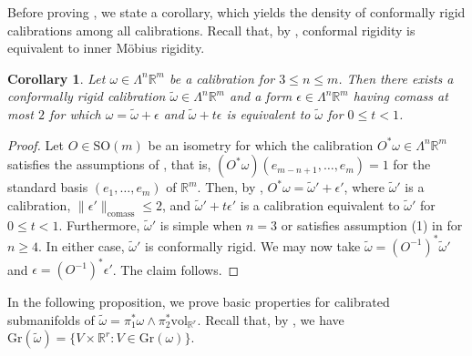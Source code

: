 \documentclass[a4paper,leqno,11pt]{amsart}
\numberwithin{equation}{section}
\newtheorem{corollary}[theorem]{Corollary}
\theoremstyle{remark}
\theoremstyle{remark}
\newcommand{\R}{\mathbb{R}}
\newcommand{\vol}{\mathrm{vol}}
\newcommand{\comass}{\mathrm{comass}}
\newcommand{\Gr}{\mathrm{Gr}}
\newcommand{\SO}{\mathrm{SO}}
\begin{document}
Before proving , we state a corollary, which yields the density of conformally rigid calibrations among all calibrations. Recall that, by , conformal rigidity is equivalent to inner Möbius rigidity. 

\begin{corollary}\label{cor:applicability}
Let $\omega \in \Lambda^n \R^m$ be a calibration for $3 \leq n \leq m$. Then there exists a conformally rigid calibration $\widetilde \omega\in \Lambda^n \R^m$ and a form $\epsilon\in \Lambda^n \R^m$ having comass at most $2$ for which $\omega = \widetilde \omega + \epsilon$ and $\widetilde \omega + t\epsilon$ is equivalent to $\widetilde \omega$ for $0\le t < 1$.
\end{corollary}

\begin{proof}
Let $O \in \SO(m)$ be an isometry for which the calibration $O^*\omega \in \Lambda^n \R^m$ satisfies the assumptions of , that is, $(O^*\omega)(e_{m-n+1},\ldots, e_m) =1$ for the standard basis $(e_1,\ldots, e_m)$ of $\R^m$. Then, by , $O^{*}\omega = \widetilde{\omega}' + \epsilon'$, where $\widetilde{\omega}'$ is a calibration, $\|\epsilon'\|_{\comass} \leq 2$, and $\widetilde{\omega}' + t \epsilon'$ is a calibration equivalent to $\widetilde{\omega}'$ for $0 \leq t < 1$. Furthermore, $\widetilde{\omega}'$ is simple when $n = 3$ or satisfies assumption (1) in  for $n \geq 4$. In either case, $\widetilde{\omega}'$ is conformally rigid. We may now take $\widetilde{\omega} = ( O^{-1} )^{*}\widetilde{\omega}'$ and $\epsilon = ( O^{-1} )^{*}\epsilon'$. The claim follows.
\end{proof}


In the following proposition, we prove basic properties for calibrated submanifolds of $\widetilde \omega = \pi_1^*\omega\wedge \pi_2^*\vol_{\R^r}$. Recall that, by , we have $\Gr(\widetilde \omega) = \{ V \times \R^r \colon V\in \Gr(\omega)\}$.
\end{document}
